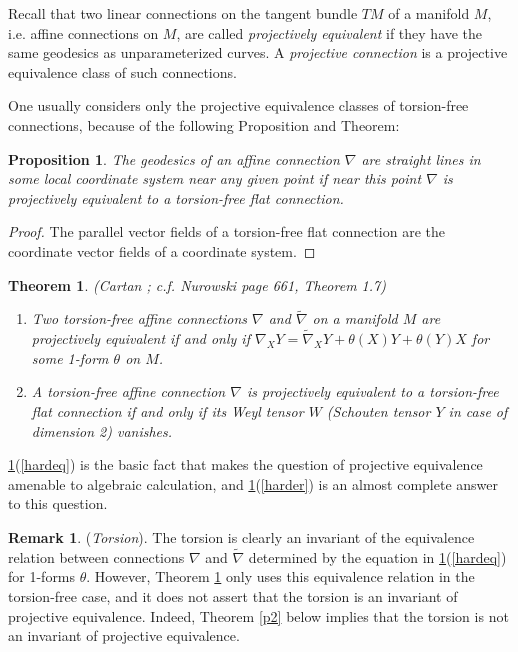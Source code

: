 \documentclass[12pt]{article}
\numberwithin{equation}{section}
\theoremstyle{plain}
\newtheorem{proposition}[definition]{Proposition}
\newtheorem{theorem}[definition]{Theorem}
\theoremstyle{definition}
\newtheorem{remark}[definition]{Remark}
\begin{document}
Recall that two linear connections on the tangent bundle $TM$ of a manifold $M$, i.e. affine connections on $M$, are called \emph{projectively equivalent} if they have the same geodesics as unparameterized curves. A \emph{projective connection} is a projective equivalence class of such connections. 

One usually considers only the projective equivalence classes of torsion-free connections, because of the following Proposition and Theorem:
\begin{proposition}\label{easyeq}The geodesics of an affine connection $\nabla$ are straight lines in some local coordinate system near any given point if near this point $\nabla$ is projectively equivalent to a torsion-free flat connection.
\end{proposition}
\begin{proof} The parallel vector fields of a torsion-free flat connection are the coordinate vector fields of a coordinate system.
\end{proof}
\begin{theorem}\label{charflat} \emph{(Cartan \cite{Cartan1924}; c.f. Nurowski \cite{nurowski} page 661, Theorem 1.7)}
\begin{enumerate}
\itemsep0em
\item{\label{hardeq}Two torsion-free affine connections $\nabla$ and $\tilde{\nabla}$ on a manifold $M$ are projectively equivalent if and only if $\nabla_{X}Y=\tilde{\nabla}_{X}Y+\theta(X)Y+\theta(Y)X$ for some 1-form $\theta$ on $M$.}
\item{\label{harder}A torsion-free affine connection $\nabla$ is projectively equivalent to a torsion-free flat connection if and only if its Weyl tensor $W$ (Schouten tensor $Y$ in case of dimension 2) vanishes.}
\end{enumerate}
\end{theorem}

\ref{charflat}(\ref{hardeq}) is the basic fact that makes the question of projective equivalence amenable to algebraic calculation, and \ref{charflat}(\ref{harder}) is an almost complete answer to this question.

\begin{remark} (\emph{Torsion}). The torsion is clearly an invariant of the equivalence relation between connections $\nabla$ and $\tilde{\nabla}$ determined by the equation in \ref{charflat}(\ref{hardeq}) for 1-forms $\theta$. However, Theorem \ref{charflat} only uses this equivalence relation in the torsion-free case, and it does not assert that the torsion is an invariant of projective equivalence. Indeed, Theorem \ref{p2} below implies that the torsion is not an invariant of projective equivalence.
\end{remark}
\end{document}
